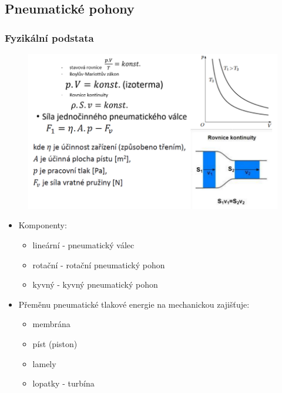 \subsection{Pneumatické pohony}
\subsubsection*{Fyzikální podstata}

\begin{figure}[h]
    \begin{center}
        \includegraphics[scale = 0.7]{img/Picture12.png}
    \end{center}
\end{figure}

\begin{itemize}
    \item Komponenty: \begin{itemize}
              \item lineární - pneumatický válec
              \item rotační - rotační pneumatický pohon
              \item kyvný - kyvný pneumatický pohon
          \end{itemize}
    \item Přeměnu pneumatické tlakové energie na mechanickou zajišťuje: \begin{itemize}
              \item membrána
              \item píst (piston)
              \item lamely
              \item lopatky - turbína
          \end{itemize}
\end{itemize}

